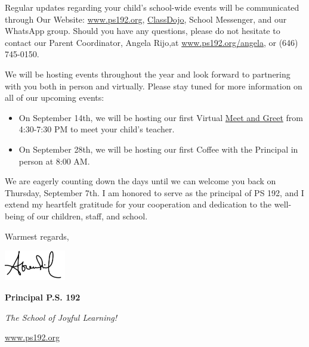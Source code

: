 \documentclass[12pt,letterpaper]{article}
\begin{document}
Regular updates regarding your child's school-wide events will be communicated through Our
Website: \url{www.ps192.org}, \href{https://www.classdojo.com/}{ClassDojo}, School Messenger, and our WhatsApp group. Should you have any questions, please do not hesitate to contact our Parent Coordinator, Angela Rijo,at \url{www.ps192.org/angela}, or (646) 745-0150.

We will be hosting events throughout the year and look forward to partnering with you both
in person and virtually. Please stay tuned for more information on all of our upcoming
events:
	\begin{itemize}
	\item On September 14th, we will be hosting our first Virtual \href{https://www.ps192.org/apps/pages/index.jsp?uREC_ID=1504975&type=d&pREC_ID=2510452&tota11y=true}{Meet and Greet} from 4:30-7:30 PM to meet your child’s teacher.
	\item On September 28th, we will be hosting our first Coffee with the Principal in
	person at 8:00 AM.
	\end{itemize}
 
We are eagerly counting down the days until we can welcome you back on Thursday, September 7th. I am honored to serve as the principal of PS 192, and I extend my heartfelt gratitude
for your cooperation and dedication to the well-being of our children, staff, and school.

Warmest regards,

\includegraphics[width=0.2\textwidth]{hil_signature}

\textbf{Principal P.S. 192}

\textit{The School of Joyful Learning!}

\url{www.ps192.org}
\end{document}
